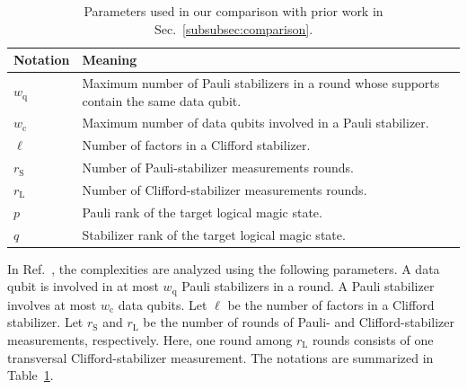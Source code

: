 \documentclass[
 reprint,
 amsmath,amssymb,
 pra,superscriptaddress, nofootinbib
]{revtex4-2}
\theoremstyle{definition}
\theoremstyle{plain}
\begin{document}
{\renewcommand{\arraystretch}{1.5}
\begin{table}
\centering
\caption{Parameters used in our comparison with prior work in Sec.~\ref{subsubsec:comparison}.}
\begin{tabular}{ll}
\hline \hline
\parbox[t]{2.5cm}{\raggedright Notation}
& \parbox[t]{14cm}{\raggedright Meaning} \\
\hline

\parbox[t]{2.5cm}{\raggedright $w_{\mathrm{q}}$}
& \parbox[t]{14cm}{\raggedright Maximum number of Pauli stabilizers in a round whose supports contain the same data qubit.} \\

\parbox[t]{2.5cm}{\raggedright $w_{\mathrm{c}}$}
& \parbox[t]{14cm}{\raggedright Maximum number of data qubits involved in a Pauli stabilizer.} \\

\parbox[t]{2.5cm}{\raggedright $\ell$}
& \parbox[t]{14cm}{\raggedright Number of factors in a Clifford stabilizer.} \\

\parbox[t]{2.5cm}{\raggedright $r_{\mathrm{S}}$}
& \parbox[t]{14cm}{\raggedright Number of Pauli-stabilizer measurements rounds.} \\

\parbox[t]{2.5cm}{\raggedright $r_{\mathrm{L}}$}
& \parbox[t]{14cm}{\raggedright Number of Clifford-stabilizer measurements rounds.} \\

\parbox[t]{2.5cm}{\raggedright $p$}
& \parbox[t]{14cm}{\raggedright Pauli rank of the target logical magic state.} \\

\parbox[t]{2.5cm}{\raggedright $q$}
& \parbox[t]{14cm}{\raggedright Stabilizer rank of the target logical magic state.} \\
\hline \hline
\end{tabular}
\label{tab:comparison_notations}
\end{table}
}

In Ref.~\cite{fby6-xjbm}, the complexities are analyzed using the following parameters. A data qubit is involved in at most $w_\mathrm{q}$ Pauli stabilizers in a round. A Pauli stabilizer involves at most $w_\mathrm{c}$ data qubits. Let $\ell$ be the number of factors in a Clifford stabilizer. Let $r_\mathrm{S}$ and $r_\mathrm{L}$ be the number of rounds of Pauli- and Clifford-stabilizer measurements, respectively. Here, one round among $r_\mathrm{L}$ rounds consists of one transversal Clifford-stabilizer measurement.
The notations are summarized in Table~\ref{tab:comparison_notations}.
\end{document}
